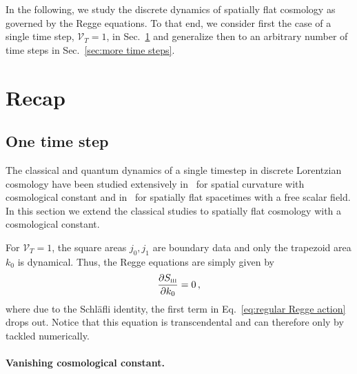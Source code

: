 \documentclass[amsmath,amssymb,aps,twocolumn,superscriptaddress,nofootinbib]{revtex4-1}
\begin{document}
In the following, we study the discrete dynamics of spatially flat cosmology as governed by the Regge equations. To that end, we consider first the case of a single time step, $\mathcal{V}_T = 1$, in Sec.~\ref{sec:recap} and generalize then to an arbitrary number of time steps in Sec.~\ref{sec:more time steps}.

\section{Recap}\label{sec:recap}

\subsection{One time step}

The classical and quantum dynamics of a single timestep in discrete Lorentzian cosmology have been studied extensively in~\cite{Dittrich:2021gww,Dittrich:2023rcr,Asante:2021phx} for spatial curvature with cosmological constant and in~\cite{Jercher:2023csk,Jercher:2024hlr} for spatially flat spacetimes with a free scalar field.
In this section we extend the classical studies to spatially flat cosmology with a cosmological constant.

For $\mathcal{V}_T = 1$, the square areas $j_0,j_1$ are boundary data and only the trapezoid area $k_0$ is dynamical. Thus, the Regge equations are simply given by
%
\begin{equation}\label{eq:1step Regge equation}
\pdv{S_{\textsc{iii}}}{k_0} = 0\,,
\end{equation}
%
%
where due to the Schl\"{a}fli identity, the first term in Eq.~\eqref{eq:regular Regge action} drops out. 
Notice that this equation is transcendental and can therefore only by tackled numerically.

\paragraph*{Vanishing cosmological constant.} 
\end{document}
